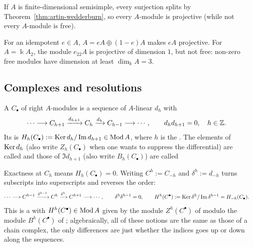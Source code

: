 \begin{example}
If $A$ is finite-dimensional semisimple, every surjection splits by Theorem~\ref{thm:artin-wedderburn}, so every $A$-module is projective (while not every $A$-module is free).
\end{example}

\begin{example}\label{ex:projective-idempotents}
For an idempotent $e\in A$, $A=eA\oplus(1-e)A$ makes $eA$ projective.
For $A=\Bbbk A_2$, the module $e_{22}A$ is projective of dimension $1$, but not free: non-zero free modules have dimension at least $\dim_\Bbbk A=3$.
\end{example}

\subsection{Complexes and resolutions}

\begin{definition}\label{def:chain-complex}\label{def:cochain-complex}\label{not:chain-differentials}
A  $C_\bullet$ of right $A$-modules is a sequence of $A$-linear  $d_h$ with
\[
\cdots\longrightarrow C_{h+1}\xrightarrow{d_{h+1}}C_h
\xrightarrow{d_h}C_{h-1}\longrightarrow\cdots,
\qquad d_h d_{h+1}=0,\quad h\in\mathbb{Z}.
\]
Its  is $H_h(C_\bullet):=\operatorname{Ker}\nolimits d_h/\operatorname{Im}\nolimits d_{h+1}\in\operatorname{\mathrm{Mod}} A$, where $h$ is the .
The elements of $\operatorname{Ker}\nolimits d_h$ (also write $Z_h(C_\bullet)$ when one wants to suppress the differential) are called  and those of $\Im d_{h+1}$ (also write $B_h(C_\bullet)$) are called 
\end{definition}

Exactness at $C_h$ means $H_h(C_\bullet)=0$.
Writing $C^h:=C_{-h}$ and $\delta^h:=d_{-h}$ turns subscripts into superscripts and reverses the order:
\[
\cdots\longrightarrow C^{h-1}\xrightarrow{\delta^{h-1}}C^h
\xrightarrow{\delta^h}C^{h+1}\longrightarrow\cdots,
\qquad \delta^h\delta^{h-1}=0,
\qquad H^h(C^\bullet):=\operatorname{Ker}\nolimits\delta^h/\operatorname{Im}\nolimits\delta^{h-1}=H_{-h}(C_\bullet).
\]
This is a  with  $H^h(C^\bullet)\in\operatorname{\mathrm{Mod}} A$ given by the module $Z^h(C^\bullet)$ of  modulo the module $B^h(C^\bullet)$ of ; algebraically, all of these notions are the same as those of a chain complex, the only differences are just whether the indices goes up or down along the sequences.

